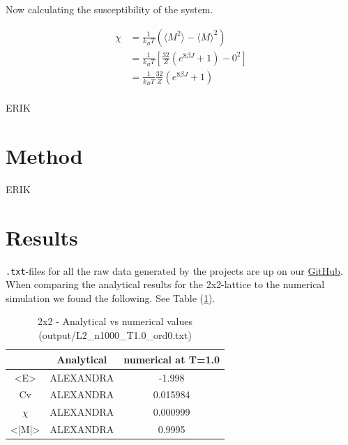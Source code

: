 \documentclass{article}
\begin{document}
Now calculating the susceptibility of the system.

\begin{align*}
    \chi &= \frac{1}{k_B T} \left( \langle M^2 \rangle - \langle M \rangle ^2 \right) \\
    &= \frac{1}{k_B T} \left[ \frac{32}{Z} \left( e^{8 \beta J} + 1 \right) - 0^2 \right] \\
    &= \frac{1}{k_B T} \frac{32}{Z} \left( e^{8 \beta J} + 1 \right) \\
\end{align*}



ERIK



\vspace{1cm}

\section{Method} \label{sec:Method}

ERIK

\vspace{1cm}

\section{Results} \label{sec:Results}

  \texttt{.txt}-files for all the raw data generated by the projects are up on our \href{https://github.com/Erikbgram/Fys3150}{GitHub}. \\

When comparing the analytical results for the 2x2-lattice to the numerical simulation we found the following. See Table (\ref{tab:analytical}).

  \begin{table}[ht]
    \centering
    \caption{2x2 - Analytical vs numerical values (output/L2\_n1000\_T1.0\_ord0.txt)}
    \vspace{2mm}
    \label{tab:analytical}
    \begin{tabular}{|c|c|c|}
        \hline
         & Analytical & numerical at T=1.0\\
        \hline \hline
        <E> & ALEXANDRA & -1.998 \\
        Cv & ALEXANDRA & 0.015984 \\
        $\chi$ & ALEXANDRA & 0.000999 \\
        <|M|> & ALEXANDRA & 0.9995 \\
        \hline
    \end{tabular} \\
    \hspace{0pt}\\
  \end{table}
\end{document}
